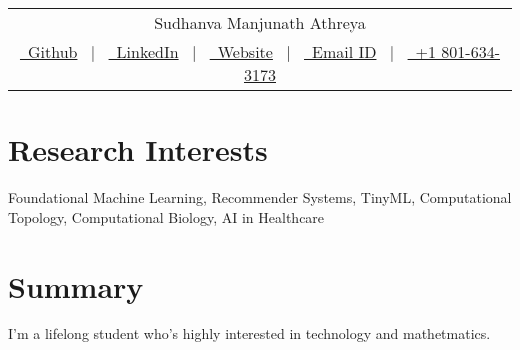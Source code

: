 \documentclass[a4paper, 11pt]{article}
\begin{document}
	
	\pagestyle{empty} 
	
	
	
	\begin{tabularx}{\linewidth}{@{} C @{}}
		\Huge{Sudhanva Manjunath Athreya} \\[7.5pt]
		\href{https://github.com/FoxHound0x00}{\raisebox{-0.05\height}\faGithub\ Github} \ $|$ \ 
		\href{https://www.linkedin.com/in/athreya32262/}{\raisebox{-0.05\height}\faLinkedin\ LinkedIn} \ $|$ \ 
		\href{https://foxhound0x00.github.io/}{\raisebox{-0.05\height}\faGlobe \ Website} \ $|$ \ 
		\href{mailto:u1529299@hotmail.com}{\raisebox{-0.05\height}\faEnvelope \ Email ID} \ $|$ \ 
		\href{tel:+91 910-817-1918}{\raisebox{-0.05\height}\faMobile \ +1 801-634-3173} \\
	\end{tabularx}
	
	
	\section{Research Interests}

	Foundational Machine Learning, Recommender Systems, TinyML, Computational Topology, Computational Biology, AI in Healthcare 
	
	\section{Summary}
	I'm a lifelong student who's highly interested in technology and mathetmatics.
\end{document}
